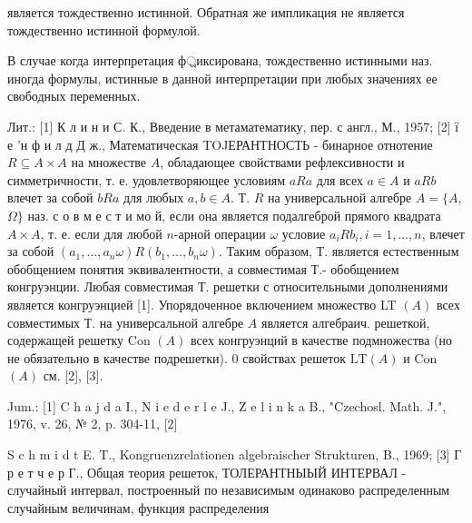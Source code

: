 \documentclass[10pt]{article}
\begin{document}
является тождественно истинной. Обратная же импликация не является тождественно истинной формулой.



В случае когда интерпретация ф্রиксирована, тождественно истинными наз. иногда формулы, истинные в данной интерпретации при любых значениях ее свободных переменных.



Лит.: [1] К л и н и С. К., Введение в метаматематику, пер. с англ., М., 1957; [2] ї е 'н ф и л д Д ж., Математическая TOJЕРАНТНОСТЬ - бинарное отнотение $R \subseteq A \times A$ на множестве $A$, обладающее свойствами рефлексивности и симметричности, т. е. удовлетворяющее условиям $a R a$ для всех $a \in A$ и $a R b$ влечет за собой $b R a$ для любых $a, b \in A$. Т. $R$ на универсальной алгебре $A=\{A$, $\Omega\}$ наз. с о в м е с т и мо й, если она является подалгеброй прямого квадрата $A \times A$, т. е. если для любой $n$-арной операции $\omega$ условие $a_{i} R b_{i}, i=1, \ldots, n$, влечет за собой $\left(a_{1}, \ldots, a_{n} \omega\right) R\left(b_{1}, \ldots, b_{n} \omega\right)$. Таким образом, Т. является естественным обобщением понятия эквивалентности, а совместимая Т.- обобщением конгруэнции. Любая совместимая Т. решетки с относительными дополнениями является конгруэнцией [1]. Упорядоченное включением множество LT $(A)$ всех совместимых Т. на универсальной алгебре $A$ является алгебраич. решеткой, содержащей решетку Con $(A)$ всех конгруэнций в качестве подмножества (но не обязательно в качестве подрешетки). 0 свойствах решеток $\mathrm{LT}(A)$ и Con $(A)$ см. [2], [3].



Jum.: [1] C h a j d a I., N i e d e r l e J., $\mathrm{Z}$ e l i n k a B., "Czechosl. Math. J.", 1976, v. 26, № 2, p. 304-11, [2]

S c h m i d t E. T., Kongruenzrelationen algebraischer Strukturen, B., 1969; [3] Г р е т ч е р Г., Общая теория решеток, ТОЛЕРАНТНЫЫЙ ИНТЕРВАЛ - случайный интервал, построенный по независимым одинаково распределенным случайным величинам, функция распределения
\end{document}
